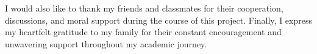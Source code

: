 \documentclass[12pt,a4paper]{report}
\begin{document}
I would also like to thank my friends and classmates for their cooperation, discussions, and moral support during the course of this project. Finally, I express my heartfelt gratitude to my family for their constant encouragement and unwavering support throughout my academic journey.


\cleardoublepage
\setcounter{page}{5}
\onehalfspacing

\tableofcontents

\cleardoublepage
\setcounter{page}{6}
\onehalfspacing


\listoftables

\cleardoublepage
\setcounter{page}{7}
\onehalfspacing

\listoffigures

\end{document}
